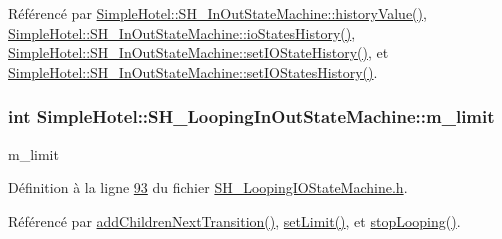 Référencé par \hyperlink{classSimpleHotel_1_1SH__InOutStateMachine_af9de98943b9428ed4144bc6695c1ada0}{Simple\-Hotel\-::\-S\-H\-\_\-\-In\-Out\-State\-Machine\-::history\-Value()}, \hyperlink{classSimpleHotel_1_1SH__InOutStateMachine_a0f59a90204a7cbb6835da28cd234978f}{Simple\-Hotel\-::\-S\-H\-\_\-\-In\-Out\-State\-Machine\-::io\-States\-History()}, \hyperlink{classSimpleHotel_1_1SH__InOutStateMachine_a7a6675495f101d29e8eb86df84961795}{Simple\-Hotel\-::\-S\-H\-\_\-\-In\-Out\-State\-Machine\-::set\-I\-O\-State\-History()}, et \hyperlink{classSimpleHotel_1_1SH__InOutStateMachine_a31eb01c590e5d9f6422eacc54d2092da}{Simple\-Hotel\-::\-S\-H\-\_\-\-In\-Out\-State\-Machine\-::set\-I\-O\-States\-History()}.

\hypertarget{classSimpleHotel_1_1SH__LoopingInOutStateMachine_ae5e496343aed89d7062e2478218f4e7d}{
\subsubsection[{m\-\_\-limit}]{\setlength{\rightskip}{0pt plus 5cm}int Simple\-Hotel\-::\-S\-H\-\_\-\-Looping\-In\-Out\-State\-Machine\-::m\-\_\-limit\hspace{0.3cm}{\ttfamily [private]}}}\label{classSimpleHotel_1_1SH__LoopingInOutStateMachine_ae5e496343aed89d7062e2478218f4e7d}


m\-\_\-limit 



Définition à la ligne \hyperlink{SH__LoopingIOStateMachine_8h_source_l00093}{93} du fichier \hyperlink{SH__LoopingIOStateMachine_8h_source}{S\-H\-\_\-\-Looping\-I\-O\-State\-Machine.\-h}.



Référencé par \hyperlink{classSimpleHotel_1_1SH__LoopingInOutStateMachine_a2ac2ff43d97fd1b12e1b30d6818f33e4}{add\-Children\-Next\-Transition()}, \hyperlink{classSimpleHotel_1_1SH__LoopingInOutStateMachine_a502bc84b055b1cbacf5999dca26bc171}{set\-Limit()}, et \hyperlink{classSimpleHotel_1_1SH__LoopingInOutStateMachine_a64951d436e3f998c7136415019021ec8}{stop\-Looping()}.

